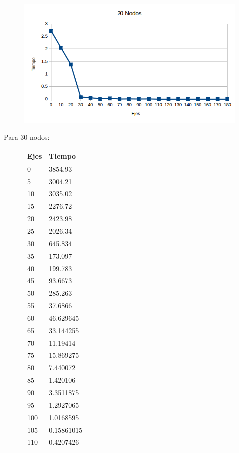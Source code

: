   \begin{figure}[h!]
   \begin{center}
 	\includegraphics[scale=0.7]{imagenes/exacto/20Nodos.png}
   \end{center}
 \end{figure}
 
 \newpage
 Para 30 nodos: \\
   \begin{figure}[h!]
   \begin{center}
\begin{tabular}{| l | l |}
  \hline
  Ejes & Tiempo \\ \hline
  0 & 3854.93 \\ \hline
  5 & 3004.21 \\ \hline
  10 & 3035.02 \\ \hline
  15 & 2276.72 \\ \hline
  20 & 2423.98 \\ \hline
  25 & 2026.34 \\ \hline
  30 & 645.834 \\ \hline
  35 & 173.097 \\ \hline
  40 & 199.783 \\ \hline
  45 & 93.6673 \\ \hline
  50 & 285.263 \\ \hline
  55 & 37.6866 \\ \hline
  60 & 46.629645 \\ \hline
  65 & 33.144255 \\ \hline
  70 & 11.19414 \\ \hline
  75 & 15.869275 \\ \hline
  80 & 7.440072 \\ \hline
  85 & 1.420106 \\ \hline
  90 & 3.3511875 \\ \hline
  95 & 1.2927065 \\ \hline
  100 & 1.0168595 \\ \hline
  105 & 0.15861015 \\ \hline
  110 & 0.4207426 \\ \hline
\end{tabular}
   \end{center}
 \end{figure}

